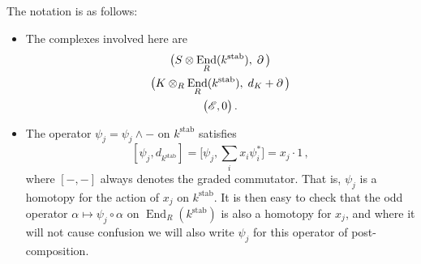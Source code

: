 \documentclass[english,letter paper,12pt,leqno]{article}
\theoremstyle{example}
\numberwithin{equation}{section}
\def\stab{\operatorname{stab}}
\DeclareMathOperator{\End}{End}
\begin{document}
The notation is as follows:
\begin{itemize}
\item The complexes involved here are
\begin{gather*}
\big( S \otimes \End_R(k^{\stab}), \; \partial \,\big)\\
\big( K \otimes_R \End_R(k^{\stab}), \; d_K + \partial\, \big)\\
\big( \md{E}, 0 \big)\,.
\end{gather*}
\item The operator $\psi_j = \psi_j \wedge -$ on $k^{\stab}$ satisfies
\[
[ \psi_j, d_{k^{\stab}} ] = \big[ \psi_j, \sum_i x_i \psi_i^* \big] = x_j \cdot 1\,,
\]
where $[-,-]$ always denotes the graded commutator. That is, $\psi_j$ is a homotopy for the action of $x_j$ on $k^{\stab}$. It is then easy to check that the odd operator $\alpha \mapsto \psi_j \circ \alpha$ on $\End_R(k^{\stab})$ is also a homotopy for $x_j$, and where it will not cause confusion we will also write $\psi_j$ for this operator of post-composition.


\end{itemize}
\end{document}
